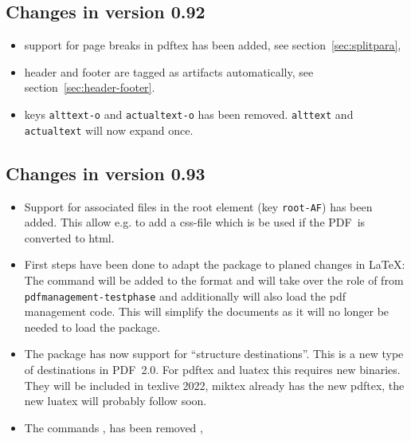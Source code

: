\documentclass[DIV=12,parskip=half-,bibliography=totoc]{scrartcl}
\newcommand\pkg[1]{\texttt{#1}}
\newcommand\PDF{PDF}
\begin{document}
\subsection{Changes in version 0.92}

\begin{itemize}
\item support for page breaks in pdftex has been added, see  section~\ref{sec:splitpara},


\item header and footer are tagged as artifacts automatically, see section~\ref{sec:header-footer}.

\item keys \texttt{alttext-o} and \texttt{actualtext-o} has been removed. \texttt{alttext} and \texttt{actualtext}
will now expand once.

\end{itemize}




\subsection{Changes in version 0.93}

\begin{itemize}
\item Support for associated files in the root element (key \texttt{root-AF})
has been added. This allow e.g. to add a css-file which is be used if the \PDF\ is converted to
html.

\item First steps have been done to adapt the package to planed changes in \LaTeX{}:
The command  will be
added to the format and will take over the role of 
from \pkg{pdfmanagement-testphase} and additionally
will also load the pdf management code. This will simplify the documents
as it will no longer be needed to load the package.

\item The package has now support for \enquote{structure destinations}.
This is a new type of destinations in \PDF~2.0.
For pdftex and luatex this requires new binaries. They will be included
in texlive 2022, miktex already has the new pdftex, the new luatex will probably follow soon.

\item The commands ,  has been removed ,

\end{itemize}
\end{document}
